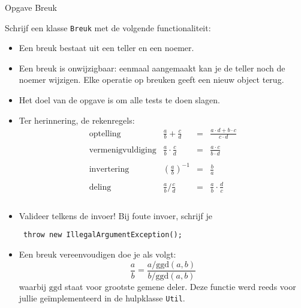 \documentclass[a4paper]{article}
\begin{document}
\begin{center}
  \Huge Opgave Breuk
\end{center}
Schrijf een klasse {\tt Breuk} met de volgende functionaliteit:
\begin{itemize}
  \item Een breuk bestaat uit een teller en een noemer.
  \item Een breuk is onwijzigbaar: eenmaal aangemaakt kan je de teller noch de noemer wijzigen.
        Elke operatie op breuken geeft een nieuw object terug.
  \item Het doel van de opgave is om alle tests te doen slagen.
  \item Ter herinnering, de rekenregels:
        \[
          \begin{array}{lrcl}
            \textrm{optelling} & \displaystyle \frac ab + \frac cd & = & \displaystyle \frac{a \cdot d+b \cdot c}{c \cdot d} \\ \\
            \textrm{vermenigvuldiging} & \displaystyle \frac ab \cdot \frac cd & = & \displaystyle \frac{a \cdot c}{b \cdot d} \\ \\
            \textrm{invertering} & \displaystyle \left(\frac ab\right)^{-1} & = & \displaystyle \frac{b}{a} \\ \\
            \textrm{deling} & \displaystyle \frac ab / \frac cd & = & \displaystyle \frac ab \cdot \frac dc \\ \\
          \end{array}
        \]
  \item Valideer telkens de invoer! Bij foute invoer, schrijf je
        \begin{center} \tt
          throw new IllegalArgumentException();
        \end{center}
  \item Een breuk vereenvoudigen doe je als volgt:
        \[
          \frac ab = \frac{a/\mathrm{ggd}(a,b)}{b/\mathrm{ggd}(a,b)}
        \]
        waarbij $\mathrm{ggd}$ staat voor grootste gemene deler. Deze functie
        werd reeds voor jullie ge\"implementeerd in de hulpklasse {\tt Util}.
\end{itemize}
\end{document}
